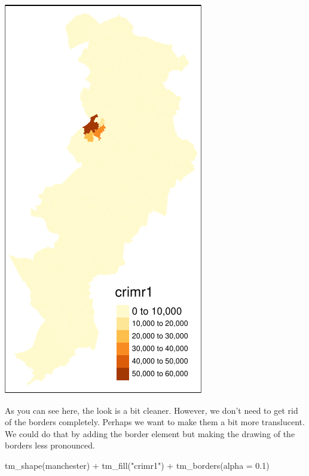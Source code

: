 \documentclass[
]{book}
\makeatletter
\newenvironment{Shaded}{\begin{snugshade}}{\end{snugshade}}
\newcommand{\AttributeTok}[1]{\textcolor[rgb]{0.61,0.61,0.61}{#1}}
\newcommand{\FloatTok}[1]{\textcolor[rgb]{0.06,0.06,0.06}{#1}}
\newcommand{\FunctionTok}[1]{\textcolor[rgb]{0,0,0}{#1}}
\newcommand{\NormalTok}[1]{#1}
\newcommand{\SpecialCharTok}[1]{\textcolor[rgb]{0,0,0}{#1}}
\newcommand{\StringTok}[1]{\textcolor[rgb]{0.5,0.5,0.5}{#1}}
\newenvironment{kframe}{%
\medskip{}
\setlength{\fboxsep}{.8em}
 \def\at@end@of@kframe{}%
 \ifinner\ifhmode%
  \def\at@end@of@kframe{\end{minipage}}%
  \begin{minipage}{\columnwidth}%
 \fi\fi%
 \def\FrameCommand##1{\hskip\@totalleftmargin \hskip-\fboxsep
 \colorbox{shadecolor}{##1}\hskip-\fboxsep
     \hskip-\linewidth \hskip-\@totalleftmargin \hskip\columnwidth}%
 \MakeFramed {\advance\hsize-\width
   \@totalleftmargin\z@ \linewidth\hsize
   \@setminipage}}%
 {\par\unskip\endMakeFramed%
 \at@end@of@kframe}
\renewenvironment{Shaded}{\begin{kframe}}{\end{kframe}}
\makeatother
\begin{document}
\includegraphics{crime_mapping_files/figure-latex/unnamed-chunk-85-1.pdf}

As you can see here, the look is a bit cleaner. However, we don't need to get rid of the borders completely. Perhaps we want to make them a bit more translucent. We could do that by adding the border element but making the drawing of the borders less pronounced.

\begin{Shaded}
\begin{Highlighting}[]
\FunctionTok{tm\_shape}\NormalTok{(manchester) }\SpecialCharTok{+} 
  \FunctionTok{tm\_fill}\NormalTok{(}\StringTok{"crimr1"}\NormalTok{) }\SpecialCharTok{+}
  \FunctionTok{tm\_borders}\NormalTok{(}\AttributeTok{alpha =} \FloatTok{0.1}\NormalTok{)}
\end{Highlighting}
\end{Shaded}
\end{document}
